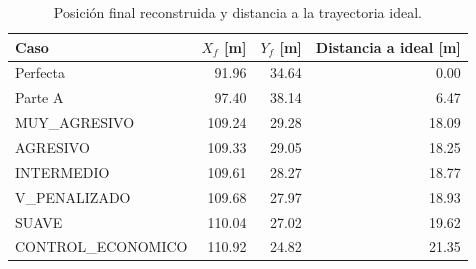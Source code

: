 \begin{table}[H]
\centering
\caption{Posición final reconstruida y distancia a la trayectoria ideal.}
\label{tab:parte-c-trayectorias}
\begin{tabular}{lrrr}
\toprule
Caso & $X_f$ [m] & $Y_f$ [m] & Distancia a ideal [m] \\
\midrule
Perfecta & 91.96 & 34.64 & 0.00 \\
Parte A & 97.40 & 38.14 & 6.47 \\
MUY\_AGRESIVO & 109.24 & 29.28 & 18.09 \\
AGRESIVO & 109.33 & 29.05 & 18.25 \\
INTERMEDIO & 109.61 & 28.27 & 18.77 \\
V\_PENALIZADO & 109.68 & 27.97 & 18.93 \\
SUAVE & 110.04 & 27.02 & 19.62 \\
CONTROL\_ECONOMICO & 110.92 & 24.82 & 21.35 \\
\bottomrule
\end{tabular}
\end{table}
